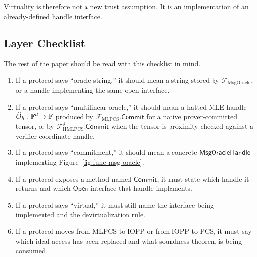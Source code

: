 Virtuality is therefore not a new trust assumption.  It is an implementation of
an already-defined handle interface.

\subsection{Layer Checklist}

The rest of the paper should be read with this checklist in mind.

\begin{enumerate}[label=\textbf{H\arabic*.},leftmargin=0.28in]
  \item If a protocol says ``oracle string,'' it should mean a string stored by
        \(\mathcal F_{\mathrm{MsgOracle}}\), or a handle implementing the same
        open interface.
  \item If a protocol says ``multilinear oracle,'' it should mean a hatted MLE
        handle \(\widehat O_h:\mathbb{F}^d\to\mathbb{F}\) produced by
        \(\mathcal F_{\mathrm{MLPCS}}.\mathsf{Commit}\) for a native
        prover-committed tensor, or by
        \(\mathcal F_{\mathrm{HMLPCS}}^\delta.\mathsf{Commit}\) when the
        tensor is proximity-checked against a verifier coordinate handle.
  \item If a protocol says ``commitment,'' it should mean a concrete
        \(\mathsf{MsgOracleHandle}\) implementing
        Figure~\ref{fig:func-msg-oracle}.
  \item If a protocol exposes a method named \(\mathsf{Commit}\), it must state
        which handle it returns and which \(\mathsf{Open}\) interface that
        handle implements.
  \item If a protocol says ``virtual,'' it must still name the interface being
        implemented and the devirtualization rule.
  \item If a protocol moves from MLPCS to IOPP or from IOPP to PCS, it must say
        which ideal access has been replaced and what soundness theorem is being
        consumed.
\end{enumerate}
